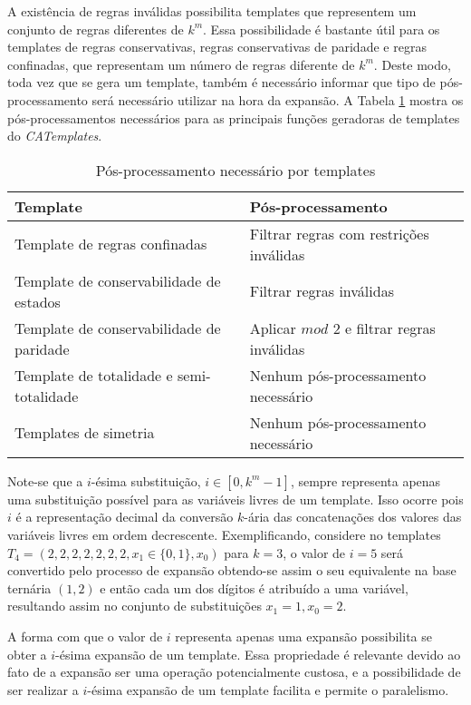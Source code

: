 A existência de regras inválidas possibilita templates que representem um conjunto de regras diferentes de $k^m$. Essa possibilidade é bastante útil para os templates de regras conservativas, regras conservativas de paridade e regras confinadas, que representam um número de regras diferente de $k^m$. Deste modo, toda vez que se gera um template, também é necessário informar que tipo de pós-processamento será necessário utilizar na hora da expansão. A Tabela \ref{tab:posProcessamento} mostra os pós-processamentos necessários para as principais funções geradoras de templates do \textit{CATemplates}.
\begin{table}[h!]
\centering
\caption{Pós-processamento necessário por templates}
	\begin{tabular}{ll}
    \toprule
	Template & Pós-processamento \\
    \midrule
	Template de regras confinadas 				& Filtrar regras com restrições inválidas	\\
	Template de conservabilidade de estados		& Filtrar regras inválidas						\\
	Template de conservabilidade de paridade 	& Aplicar $mod$ $2$ e filtrar regras inválidas	\\
	Template de totalidade e semi-totalidade 	& Nenhum pós-processamento necessário 				\\
	Templates de simetria		 				& Nenhum pós-processamento necessário 				\\
    \bottomrule
	\end{tabular}
\label{tab:posProcessamento}
\end{table}

Note-se que a $i$-ésima substituição, $i \in [0,k^m-1]$, sempre representa apenas uma substituição possível para as variáveis livres de um template. Isso ocorre pois $i$ é a representação decimal da conversão $k$-ária das concatenações dos valores das variáveis livres em ordem decrescente. Exemplificando, considere no templates $T_4 = (2,2,2,2,2,2,2,x_1\in \{0,1\},x_0)$ para $k=3$, o valor de $i=5$ será convertido pelo processo de expansão obtendo-se assim o seu equivalente na base ternária $(1,2)$ e então cada um dos dígitos é atribuído a uma variável, resultando assim no conjunto de substituições ${x_1=1,x_0=2}$.

A forma com que o valor de $i$ representa apenas uma expansão possibilita se obter a $i$-ésima expansão de um template. Essa propriedade é relevante devido ao fato de a expansão ser uma operação potencialmente custosa, e a possibilidade de ser realizar a $i$-ésima expansão de um template facilita e permite o paralelismo.

